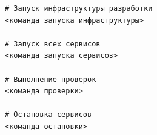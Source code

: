 \documentclass[12pt,a4paper]{extarticle}
\begin{document}
\begin{verbatim}
# Запуск инфраструктуры разработки
<команда запуска инфраструктуры>

# Запуск всех сервисов
<команда запуска сервисов>

# Выполнение проверок
<команда проверки>

# Остановка сервисов
<команда остановки>
\end{verbatim}

\clearpage



\end{document}

